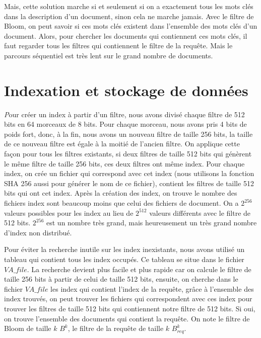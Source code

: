 	Mais, cette solution marche si et seulement si on a exactement tous les mots clés dans la description d'un document, sinon cela ne marche jamais. Avec le filtre de Bloom, on peut savoir si ces mots clés existent dans l'ensemble des mots clés d'un document. Alors, pour chercher les documents qui contiennent ces mots clés, il faut regarder tous les filtres qui contiennent le filtre de la requête. Mais le parcours séquentiel est très lent sur le grand nombre de documents. 
	
\section{Indexation et stockage de données}
	{\huge \itshape P}our créer un index à partir d'un filtre, nous avons divisé chaque filtre de 512 bits en 64 morceaux de 8 bits. Pour chaque morceau, nous avons pris 4 bits de poids fort, donc, à la fin, nous avons un nouveau filtre de taille 256 bits, la taille de ce nouveau filtre est égale à la moitié de l'ancien filtre. On applique cette façon pour tous les filtres existants, si deux filtres de taille 512 bits qui génèrent le même filtre de taille 256 bits, ces deux filtres ont même index. Pour chaque index, on crée un fichier qui correspond avec cet index (\-nous utilisons la fonction SHA 256 aussi pour générer le nom de ce fichier), contient les filtres de taille 512 bits qui ont cet index. Après la création des index, on trouve le nombre des fichiers index sont beaucoup moins que celui des fichiers de document. On a $2^{256}$ valeurs possibles pour les index au lieu de $2^{512}$ valeurs différents avec le filtre de 512 bits. $2^{256}$ est un nombre très grand, mais heureusement un très grand nombre d'index non distribué.
	
	Pour éviter la recherche inutile sur les index inexistants, nous avons utilisé un tableau qui contient tous les index occupés. Ce tableau se situe dans le fichier $VA\_file$. La recherche devient plus facile et plus rapide car on calcule le filtre de taille 256 bits à partir de celui de taille 512 bits, ensuite, on cherche dans le fichier $VA\_file$ les index qui contient l'index de la requête, grâce à l'ensemble des index trouvés, on peut trouver les fichiers qui correspondent avec ces index pour trouver les filtres de taille 512 bits qui contiennent notre filtre de 512 bits. Si oui, on trouve l'ensemble des documents qui contient la requête. On note le filtre de Bloom de taille $k$ $B^k$, le filtre de la requête de taille $k$ $B^{k}_{req}$.
	
